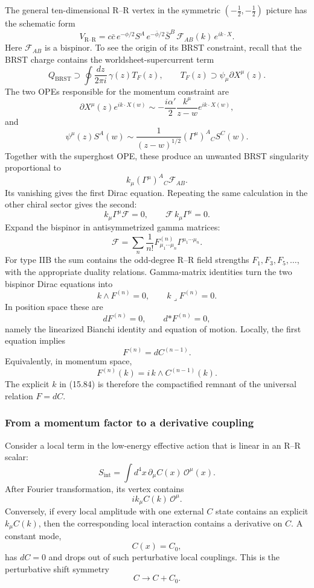\documentclass[
  10pt,
  a4paper,
  openany]{book}
\begin{document}
The general ten-dimensional R--R vertex in the symmetric
\((-\frac12,-\frac12)\) picture has the schematic form \[
V_{\mathrm{R\text{--}R}}
=
c\bar c\,
e^{-\phi/2}S^A\,
e^{-\bar\phi/2}\bar S^B\,
\mathcal F_{AB}(k)\,
e^{ik\cdot X}.
\] Here \(\mathcal F_{AB}\) is a bispinor. To see the origin of its BRST
constraint, recall that the BRST charge contains the
worldsheet-supercurrent term \[
Q_{\mathrm{BRST}}
\supset
\oint\frac{dz}{2\pi i}\,
\gamma(z)T_F(z),
\qquad
T_F(z)\supset\psi_\mu\partial X^\mu(z).
\] The two OPEs responsible for the momentum constraint are \[
\partial X^\mu(z)e^{ik\cdot X(w)}
\sim
-\frac{i\alpha'}2
\frac{k^\mu}{z-w}e^{ik\cdot X(w)},
\] and \[
\psi^\mu(z)S^A(w)
\sim
\frac{1}{(z-w)^{1/2}}
(\Gamma^\mu)^A{}_{C}S^C(w).
\] Together with the superghost OPE, these produce an unwanted BRST
singularity proportional to \[
k_\mu(\Gamma^\mu)^A{}_{C}\mathcal F_{AB}.
\] Its vanishing gives the first Dirac equation. Repeating the same
calculation in the other chiral sector gives the second: \[
\boxed{
k_\mu\Gamma^\mu\mathcal F=0,
\qquad
\mathcal F\,k_\mu\Gamma^\mu=0.
}
\] Expand the bispinor in antisymmetrized gamma matrices: \[
\mathcal F
=
\sum_n\frac1{n!}
F^{(n)}_{\mu_1\cdots\mu_n}
\Gamma^{\mu_1\cdots\mu_n}.
\] For type IIB the sum contains the odd-degree R--R field strengths
\(F_1,F_3,F_5,\ldots\), with the appropriate duality relations.
Gamma-matrix identities turn the two bispinor Dirac equations into \[
k\wedge F^{(n)}=0,
\qquad
k\mathbin{\lrcorner}F^{(n)}=0.
\] In position space these are \[
dF^{(n)}=0,
\qquad
d{*F^{(n)}}=0,
\] namely the linearized Bianchi identity and equation of motion.
Locally, the first equation implies \[
F^{(n)}=dC^{(n-1)}.
\] Equivalently, in momentum space, \[
\boxed{
F^{(n)}(k)
=
i\,k\wedge C^{(n-1)}(k).
}
\] The explicit \(k\) in (15.84) is therefore the compactified remnant
of the universal relation \(F=dC\).

\subsubsection{From a momentum factor to a derivative
coupling}\label{from-a-momentum-factor-to-a-derivative-coupling}

Consider a local term in the low-energy effective action that is linear
in an R--R scalar: \[
S_{\mathrm{int}}
=
\int d^4x\,
\partial_\mu C(x)\,\mathcal O^\mu(x).
\] After Fourier transformation, its vertex contains \[
ik_\mu C(k)\,\mathcal O^\mu.
\] Conversely, if every local amplitude with one external \(C\) state
contains an explicit \(k_\mu C(k)\), then the corresponding local
interaction contains a derivative on \(C\). A constant mode, \[
C(x)=C_0,
\] has \(dC=0\) and drops out of such perturbative local couplings. This
is the perturbative shift symmetry \[
C\longrightarrow C+C_0.
\]
\end{document}
